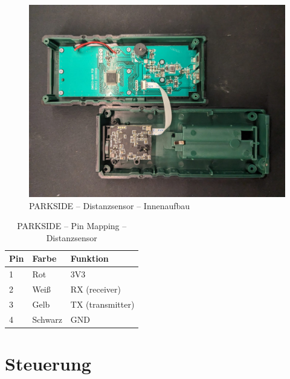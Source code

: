 \begin{figure}[ht]
	\begin{center}
		\includegraphics[width=1\textwidth]{img/2_sen/dis_parkside_1_outside.png}
		\caption{PARKSIDE – Distanzsensor – Innenaufbau}
		\label{img_2_2:sen_dis_parkside:1}
	\end{center}
\end{figure}


\begin{table}[ht]
	\centering
	\caption{PARKSIDE – Pin Mapping – Distanzsensor}
	\label{parkside:pinmapping}
	\begin{tabular}{l|ll}
		\hline
		\textbf{Pin} & \textbf{Farbe} & \textbf{Funktion} \\ \hline
		1            & Rot            & 3V3               \\
		2            & Weiß           & RX (receiver)     \\
		3            & Gelb           & TX (transmitter)  \\
		4            & Schwarz        & GND               \\ \hline
	\end{tabular}
\end{table}





\section{Steuerung}

